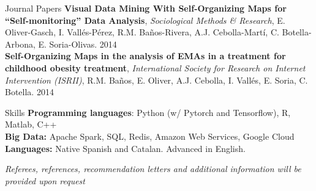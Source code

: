 \documentclass{resume} %
\begin{document}

\begin{rSection}{Journal Papers}
{\textbf{Visual Data Mining With Self-Organizing Maps for ``Self-monitoring'' Data Analysis}, \textit{Sociological Methods \& Research}, E. Oliver-Gasch, I. Vallés-Pérez, R.M. Baños-Rivera, A.J. Cebolla-Martí, C. Botella-Arbona, E. Soria-Olivas. \hfill {2014}}\\
{\textbf{Self-Organizing Maps in the analysis of EMAs in a treatment for childhood obesity treatment}, \textit{International Society for Research on Internet Intervention (ISRII)}, R.M. Baños, E. Oliver, A.J. Cebolla, I. Vallés, E. Soria, C. Botella.  \hfill {2014}}

\end{rSection}




\begin{rSection}{Skills} \itemsep -3pt  
{\textbf{Programming languages}: Python (w/ Pytorch and Tensorflow), R, Matlab, C++ }  \\
{\textbf{Big Data:} Apache Spark, SQL, Redis, Amazon Web Services, Google Cloud } \\
{\textbf{Languages:} Native Spanish and Catalan. Advanced in English.}
\end{rSection}  
 
\vspace{\fill}

\begin{flushright}
	\small{\textit{Referees, references, recommendation letters and additional information will be provided upon request}}
\end{flushright}
\end{document}
